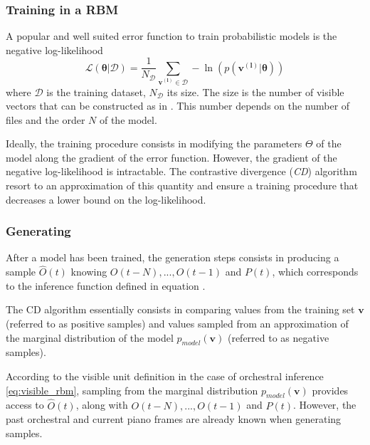 \documentclass{article}
\begin{document}
\subsubsection{Training in a RBM}
A popular and well suited error function to train probabilistic models is the negative log-likelihood 
\begin{equation}
\label{eq:likelihood}
\mathcal{L(\bm{\theta}|\mathcal{D})}  = \frac{1}{N_{\mathcal{D}}} \sum_{\bm{v^{(l)}} \in \mathcal{D}} - \ln \left( p(\bm{v^{(l)}}|\bm{\theta})\right)
\end{equation}
where $\mathcal{D}$ is the training dataset, $N_{\mathcal{D}}$ its size. The size is the number of visible vectors that can be constructed as in . This number depends on the number of files and the order $N$ of the model.

Ideally, the training procedure consists in modifying the parameters $\Theta$ of the model along the gradient of the error function.
However, the gradient of the negative log-likelihood is intractable.
The contrastive divergence (\textit{CD}) algorithm \cite{fischer2012introduction,hinton2010practical} resort to an approximation of this quantity and ensure a training procedure that decreases a lower bound on the log-likelihood.

\subsubsection{Generating}
After a model has been trained, the generation steps consists in producing a sample $\hat{O}(t)$ knowing $O(t-N),...,O(t-1)$ and $P(t)$, which corresponds to the inference function defined in equation .

The CD algorithm essentially consists in comparing values from the training set $\bm{v}$ (referred to as positive samples) and  values sampled from an approximation of the marginal distribution of the model $p_{model}(\bm{v})$ (referred to as negative samples).

According to the visible unit definition in the case of orchestral inference \ref{eq:visible_rbm}, sampling from the marginal distribution $p_{model}(\bm{v})$ provides access to $\hat{O}(t)$, along with $O(t-N),...,O(t-1)$ and $P(t)$.
However, the past orchestral and current piano frames are already known when generating samples.
\end{document}
